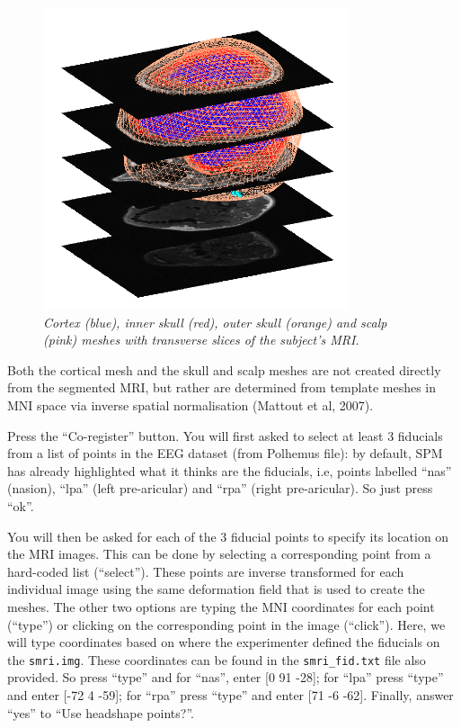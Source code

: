 \begin{figure}
\begin{center}
\includegraphics[width=90mm]{multimodal/figures/eeg_meshing}
\caption{\em Cortex (blue), inner skull (red), outer skull (orange) and scalp (pink) meshes with transverse slices of the subject's MRI. \label{multimodal:fig:3}}
\end{center}
\end{figure}

Both the cortical mesh and the skull and scalp meshes are not created directly from the segmented MRI, but rather are determined from template meshes in MNI space via inverse spatial normalisation (Mattout et al, 2007).

Press the ``Co-register'' button. You will first asked to select at least 3 fiducials from a list of points in the EEG dataset (from Polhemus file): by default, SPM has already highlighted what it thinks are the fiducials, i.e, points labelled ``nas'' (nasion), ``lpa'' (left pre-aricular) and ``rpa'' (right pre-aricular). So just press ``ok''.

You will then be asked for each of the 3 fiducial points to specify its location on the MRI images. This can be done by selecting a corresponding point from a hard-coded list (``select''). These points are inverse transformed for each individual image using the same deformation field that is used to create the meshes. The other two options are typing the MNI coordinates for each point (``type'') or clicking on the corresponding point in the image (``click''). Here, we will type coordinates based on where the experimenter defined the fiducials on the \texttt{smri.img}. These coordinates can be found in the \texttt{smri\_fid.txt} file also provided. So press ``type'' and for ``nas'', enter [0 91 -28]; for ``lpa'' press ``type'' and enter [-72 4 -59]; for ``rpa'' press ``type'' and enter [71 -6 -62]. Finally, answer ``yes'' to ``Use headshape points?''.


